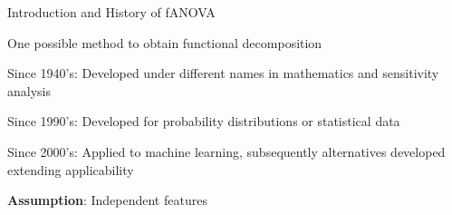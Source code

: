 \documentclass[10pt,compress,t,notes=noshow, xcolor=table]{beamer}
\begin{document}


\begin{framei}[align=top]{Introduction and History of fANOVA}
\item One possible method to obtain functional decomposition
\item Since 1940's: Developed under different names in mathematics and sensitivity analysis
\item Since 1990's: Developed for probability distributions or statistical data
\item Since 2000's: Applied to machine learning, subsequently alternatives developed extending applicability
\item \textbf{Assumption}: Independent features
\end{framei}
\end{document}
